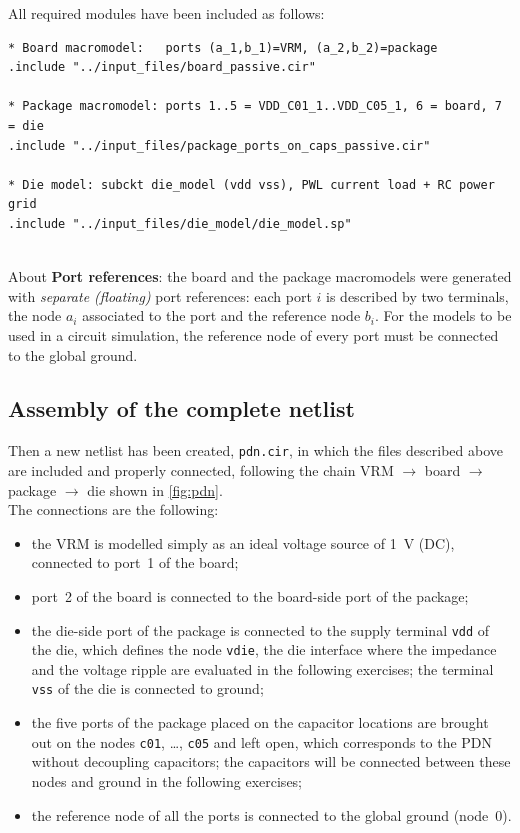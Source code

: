 \noindent All required modules have been included as follows:
\begin{lstlisting}[language={ltspice}, caption={Declaration of the modules in the netlist \texttt{pdn.cir}.}, label={lst:pdn_include}]
* Board macromodel:   ports (a_1,b_1)=VRM, (a_2,b_2)=package
.include "../input_files/board_passive.cir"

* Package macromodel: ports 1..5 = VDD_C01_1..VDD_C05_1, 6 = board, 7 = die
.include "../input_files/package_ports_on_caps_passive.cir"

* Die model: subckt die_model (vdd vss), PWL current load + RC power grid
.include "../input_files/die_model/die_model.sp"
\end{lstlisting}

\noindent\\ About \textbf{Port references}: the board and the package macromodels were generated with \textit{separate (floating)} port references:
each port $i$ is described by two terminals, the node $a_i$ associated to the port and the reference node $b_i$. For the models to be used in a
circuit simulation, the reference node of every port must be connected to the global ground.


\newpage
\subsection{Assembly of the complete netlist}

Then a new netlist has been created, \texttt{pdn.cir}, in which the files described above are included and properly connected, following the chain
VRM $\rightarrow$ board $\rightarrow$ package $\rightarrow$ die shown in \autoref{fig:pdn}.\\ The connections are the following:
\begin{itemize}
  \item the VRM is modelled simply as an ideal voltage source of 1~V (DC), connected to port~1 of the board;
  \item port~2 of the board is connected to the board-side port of the package;
  \item the die-side port of the package is connected to the supply terminal \texttt{vdd} of the die, which defines the node \texttt{vdie}, the die interface where the impedance and the voltage ripple are evaluated in the following exercises; the terminal \texttt{vss} of the die is connected to ground;
  \item the five ports of the package placed on the capacitor locations are brought out on the nodes \texttt{c01}, \dots, \texttt{c05} and left open, which corresponds to the PDN without decoupling capacitors; the capacitors will be connected between these nodes and ground in the following exercises;
  \item the reference node of all the ports is connected to the global ground (node~0).
\end{itemize}

